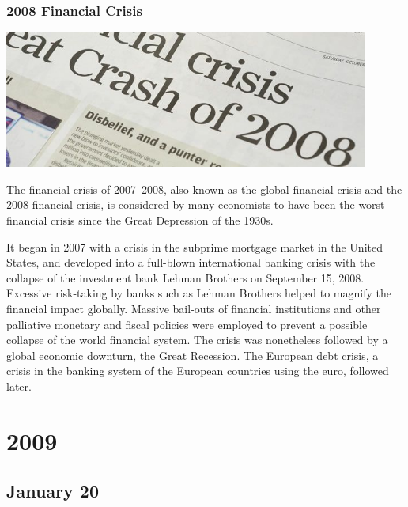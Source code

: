 \documentclass[11pt]{report}
\begin{document}
\subsection{2008 Financial Crisis}
\vspace{2mm}\begin{center}\includegraphics[width=12cm]{./img/fcrash2008.jpg}\end{center}
The financial crisis of 2007–2008, also known as the global financial crisis and the 2008 financial crisis, is considered by many economists to have been the worst financial crisis since the Great Depression of the 1930s.

It began in 2007 with a crisis in the subprime mortgage market in the United States, and developed into a full-blown international banking crisis with the collapse of the investment bank Lehman Brothers on September 15, 2008. Excessive risk-taking by banks such as Lehman Brothers helped to magnify the financial impact globally. Massive bail-outs of financial institutions and other palliative monetary and fiscal policies were employed to prevent a possible collapse of the world financial system. The crisis was nonetheless followed by a global economic downturn, the Great Recession. The European debt crisis, a crisis in the banking system of the European countries using the euro, followed later.

\chapter{2009}
\section{January 20}
\end{document}
